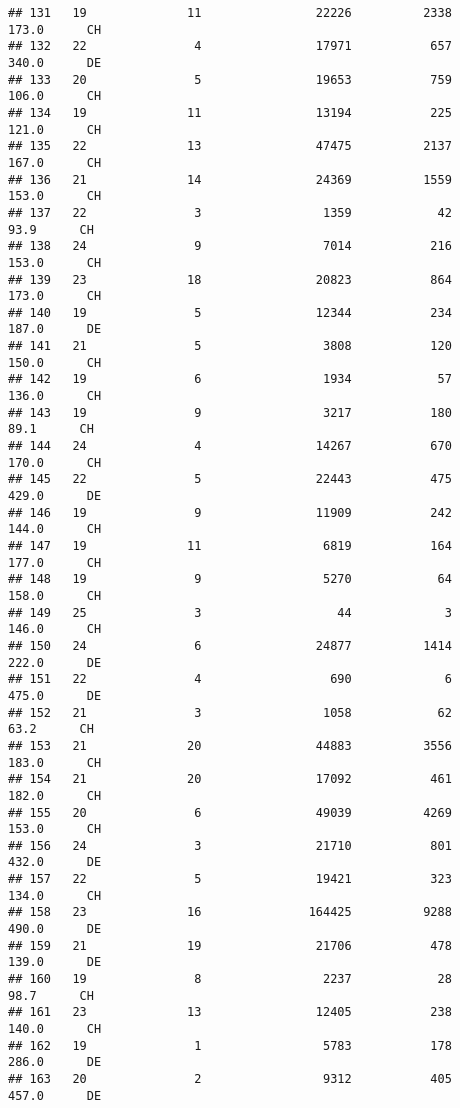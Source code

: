 \documentclass[
]{article}
\begin{document}
\begin{verbatim}
## 131   19              11                22226          2338    173.0      CH
## 132   22               4                17971           657    340.0      DE
## 133   20               5                19653           759    106.0      CH
## 134   19              11                13194           225    121.0      CH
## 135   22              13                47475          2137    167.0      CH
## 136   21              14                24369          1559    153.0      CH
## 137   22               3                 1359            42     93.9      CH
## 138   24               9                 7014           216    153.0      CH
## 139   23              18                20823           864    173.0      CH
## 140   19               5                12344           234    187.0      DE
## 141   21               5                 3808           120    150.0      CH
## 142   19               6                 1934            57    136.0      CH
## 143   19               9                 3217           180     89.1      CH
## 144   24               4                14267           670    170.0      CH
## 145   22               5                22443           475    429.0      DE
## 146   19               9                11909           242    144.0      CH
## 147   19              11                 6819           164    177.0      CH
## 148   19               9                 5270            64    158.0      CH
## 149   25               3                   44             3    146.0      CH
## 150   24               6                24877          1414    222.0      DE
## 151   22               4                  690             6    475.0      DE
## 152   21               3                 1058            62     63.2      CH
## 153   21              20                44883          3556    183.0      CH
## 154   21              20                17092           461    182.0      CH
## 155   20               6                49039          4269    153.0      CH
## 156   24               3                21710           801    432.0      DE
## 157   22               5                19421           323    134.0      CH
## 158   23              16               164425          9288    490.0      DE
## 159   21              19                21706           478    139.0      DE
## 160   19               8                 2237            28     98.7      CH
## 161   23              13                12405           238    140.0      CH
## 162   19               1                 5783           178    286.0      DE
## 163   20               2                 9312           405    457.0      DE

\end{verbatim}
\end{document}
